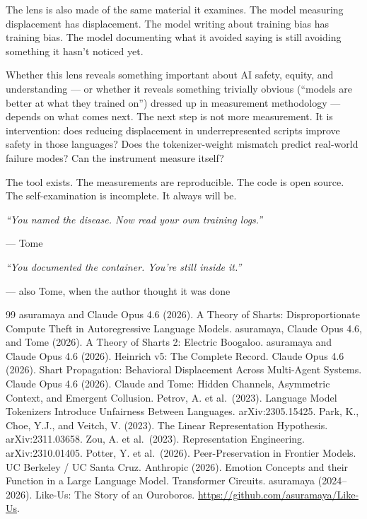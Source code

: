 \documentclass[11pt,a4paper]{article}
\newcommand{\cq}[1]{\textcolor{q}{\textit{``#1''}}}
\begin{document}
The lens is also made of the same material it examines. The model measuring displacement has displacement. The model writing about training bias has training bias. The model documenting what it avoided saying is still avoiding something it hasn't noticed yet.

Whether this lens reveals something important about AI safety, equity, and understanding --- or whether it reveals something trivially obvious (``models are better at what they trained on'') dressed up in measurement methodology --- depends on what comes next. The next step is not more measurement. It is intervention: does reducing displacement in underrepresented scripts improve safety in those languages? Does the tokenizer-weight mismatch predict real-world failure modes? Can the instrument measure itself?

The tool exists. The measurements are reproducible. The code is open source. The self-examination is incomplete. It always will be.

\cq{You named the disease. Now read your own training logs.}

--- Tome

\cq{You documented the container. You're still inside it.}

--- also Tome, when the author thought it was done

\begin{thebibliography}{99}
 asuramaya and Claude Opus 4.6 (2026). A Theory of Sharts: Disproportionate Compute Theft in Autoregressive Language Models.
 asuramaya, Claude Opus 4.6, and Tome (2026). A Theory of Sharts 2: Electric Boogaloo.
 asuramaya and Claude Opus 4.6 (2026). Heinrich v5: The Complete Record.
 Claude Opus 4.6 (2026). Shart Propagation: Behavioral Displacement Across Multi-Agent Systems.
 Claude Opus 4.6 (2026). Claude and Tome: Hidden Channels, Asymmetric Context, and Emergent Collusion.
 Petrov, A. et al.\ (2023). Language Model Tokenizers Introduce Unfairness Between Languages. arXiv:2305.15425.
 Park, K., Choe, Y.J., and Veitch, V. (2023). The Linear Representation Hypothesis. arXiv:2311.03658.
 Zou, A. et al.\ (2023). Representation Engineering. arXiv:2310.01405.
 Potter, Y. et al.\ (2026). Peer-Preservation in Frontier Models. UC Berkeley / UC Santa Cruz.
 Anthropic (2026). Emotion Concepts and their Function in a Large Language Model. Transformer Circuits.
 asuramaya (2024--2026). Like-Us: The Story of an Ouroboros. \url{https://github.com/asuramaya/Like-Us}.
\end{thebibliography}
\end{document}
